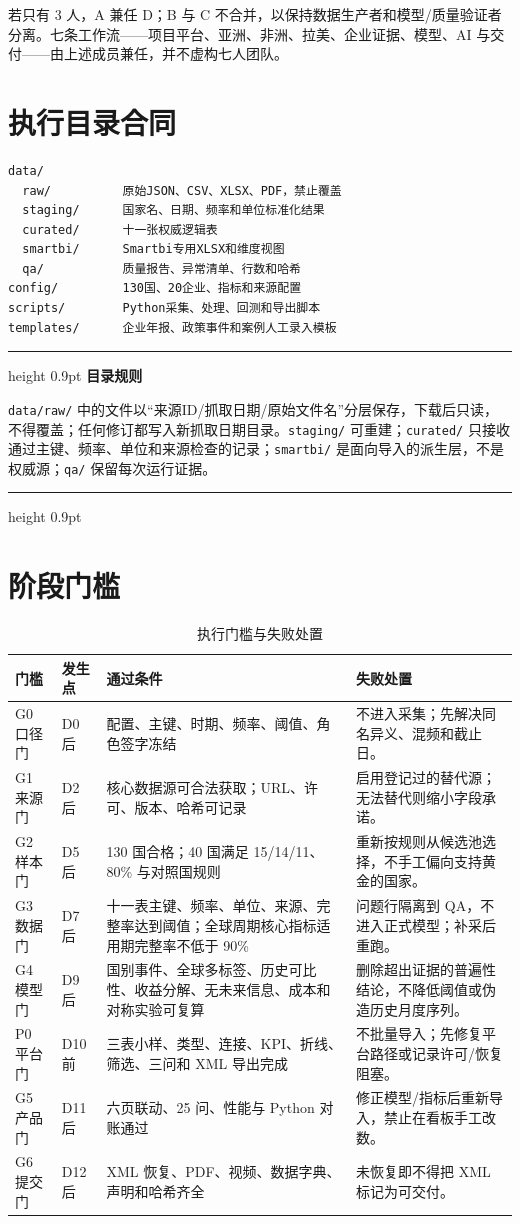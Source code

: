 \documentclass[UTF8,fontset=windows,12pt,openany]{ctexbook}
\newenvironment{warningbox}[1][]{%
  \par\medskip\noindent\begin{center}\begin{minipage}{0.93\textwidth}%
  \color{TextGray}\hrule height 0.9pt\vspace{0.45em}%
  \textbf{#1}\par\smallskip\color{black}%
}{%
  \par\vspace{0.35em}\color{TextGray}\hrule height 0.9pt%
  \end{minipage}\end{center}\medskip%
}
\newcommand{\File}[1]{{\small\begingroup\urlstyle{same}\nolinkurl{#1}\endgroup}}
\begin{document}
若只有 3 人，A 兼任 D；B 与 C 不合并，以保持数据生产者和模型/质量验证者分离。七条工作流——项目平台、亚洲、非洲、拉美、企业证据、模型、AI 与交付——由上述成员兼任，并不虚构七人团队。

\section{执行目录合同}

\begin{verbatim}
data/
  raw/          原始JSON、CSV、XLSX、PDF，禁止覆盖
  staging/      国家名、日期、频率和单位标准化结果
  curated/      十一张权威逻辑表
  smartbi/      Smartbi专用XLSX和维度视图
  qa/           质量报告、异常清单、行数和哈希
config/         130国、20企业、指标和来源配置
scripts/        Python采集、处理、回测和导出脚本
templates/      企业年报、政策事件和案例人工录入模板
\end{verbatim}

\begin{warningbox}[目录规则]
\File{data/raw/} 中的文件以“来源ID/抓取日期/原始文件名”分层保存，下载后只读，不得覆盖；任何修订都写入新抓取日期目录。\File{staging/} 可重建；\File{curated/} 只接收通过主键、频率、单位和来源检查的记录；\File{smartbi/} 是面向导入的派生层，不是权威源；\File{qa/} 保留每次运行证据。
\end{warningbox}

\section{阶段门槛}

\begin{longtable}{p{1.8cm}p{3.3cm}p{5.0cm}p{3.4cm}}
\caption{执行门槛与失败处置}\label{tab:gates}\\
\toprule
\textbf{门槛} & \textbf{发生点} & \textbf{通过条件} & \textbf{失败处置}\\
\midrule
G0 口径门 & D0 后 & 配置、主键、时期、频率、阈值、角色签字冻结 & 不进入采集；先解决同名异义、混频和截止日。\\
G1 来源门 & D2 后 & 核心数据源可合法获取；URL、许可、版本、哈希可记录 & 启用登记过的替代源；无法替代则缩小字段承诺。\\
G2 样本门 & D5 后 & 130 国合格；40 国满足 15/14/11、80\% 与对照国规则 & 重新按规则从候选池选择，不手工偏向支持黄金的国家。\\
G3 数据门 & D7 后 & 十一表主键、频率、单位、来源、完整率达到阈值；全球周期核心指标适用期完整率不低于 90\% & 问题行隔离到 QA，不进入正式模型；补采后重跑。\\
G4 模型门 & D9 后 & 国别事件、全球多标签、历史可比性、收益分解、无未来信息、成本和对称实验可复算 & 删除超出证据的普遍性结论，不降低阈值或伪造历史月度序列。\\
P0 平台门 & D10 前 & 三表小样、类型、连接、KPI、折线、筛选、三问和 XML 导出完成 & 不批量导入；先修复平台路径或记录许可/恢复阻塞。\\
G5 产品门 & D11 后 & 六页联动、25 问、性能与 Python 对账通过 & 修正模型/指标后重新导入，禁止在看板手工改数。\\
G6 提交门 & D12 后 & XML 恢复、PDF、视频、数据字典、声明和哈希齐全 & 未恢复即不得把 XML 标记为可交付。\\
\bottomrule
\end{longtable}
\end{document}
